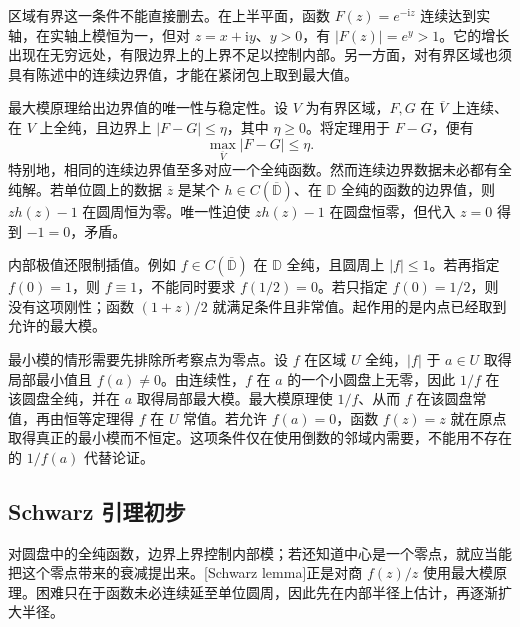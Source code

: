 \ProseParagraphBreak

区域有界这一条件不能直接删去。在上半平面，函数 \(F(z)=e^{-\mathrm{i}z}\) 连续达到实轴，在实轴上模恒为一，但对 \(z=x+\mathrm{i}y\)、\(y>0\)，有 \(|F(z)|=e^y>1\)。它的增长出现在无穷远处，有限边界上的上界不足以控制内部。另一方面，对有界区域也须具有陈述中的连续边界值，才能在紧闭包上取到最大值。

\ProseParagraphBreak

最大模原理给出边界值的唯一性与稳定性。设 \(V\) 为有界区域，\(F,G\) 在 \(\overline V\) 上连续、在 \(V\) 上全纯，且边界上 \(|F-G|\le\eta\)，其中 \(\eta\ge0\)。将定理用于 \(F-G\)，便有
\[
 \max_{\overline V}|F-G|\le\eta.
\]
特别地，相同的连续边界值至多对应一个全纯函数。然而连续边界数据未必都有全纯解。若单位圆上的数据 \(\overline z\) 是某个 \(h\in C(\overline{\mathbb D})\)、在 \(\mathbb D\) 全纯的函数的边界值，则 \(zh(z)-1\) 在圆周恒为零。唯一性迫使 \(zh(z)-1\) 在圆盘恒零，但代入 \(z=0\) 得到 \(-1=0\)，矛盾。

\ProseParagraphBreak

内部极值还限制插值。例如 \(f\in C(\overline{\mathbb D})\) 在 \(\mathbb D\) 全纯，且圆周上 \(|f|\le1\)。若再指定 \(f(0)=1\)，则 \(f\equiv1\)，不能同时要求 \(f(1/2)=0\)。若只指定 \(f(0)=1/2\)，则没有这项刚性；函数 \((1+z)/2\) 就满足条件且非常值。起作用的是内点已经取到允许的最大模。

\ProseParagraphBreak

最小模的情形需要先排除所考察点为零点。设 \(f\) 在区域 \(U\) 全纯，\(|f|\) 于 \(a\in U\) 取得局部最小值且 \(f(a)\ne0\)。由连续性，\(f\) 在 \(a\) 的一个小圆盘上无零，因此 \(1/f\) 在该圆盘全纯，并在 \(a\) 取得局部最大模。最大模原理使 \(1/f\)、从而 \(f\) 在该圆盘常值，再由恒等定理得 \(f\) 在 \(U\) 常值。若允许 \(f(a)=0\)，函数 \(f(z)=z\) 就在原点取得真正的最小模而不恒定。这项条件仅在使用倒数的邻域内需要，不能用不存在的 \(1/f(a)\) 代替论证。

\subsection{Schwarz 引理初步}
\label{b3:subsec:020404}

对圆盘中的全纯函数，边界上界控制内部模；若还知道中心是一个零点，就应当能把这个零点带来的衰减提出来。[Schwarz lemma]正是对商 \(f(z)/z\) 使用最大模原理。困难只在于函数未必连续延至单位圆周，因此先在内部半径上估计，再逐渐扩大半径。

